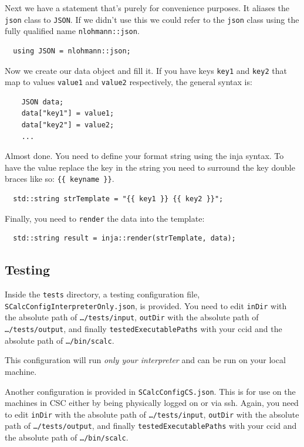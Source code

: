 \documentclass{article}
\newcommand{\code}[1]{\texttt{\textmd{#1}}}
\begin{document}
Next we have a statement that's purely for convenience purposes. It aliases the \code{json} class
to \code{JSON}. If we didn't use this we could refer to the \code{json} class using the fully
qualified name \code{nlohmann::json}.
\begin{lstlisting}
  using JSON = nlohmann::json;
\end{lstlisting}

Now we create our data object and fill it. If you have keys \code{key1} and \code{key2} that map to
values \code{value1} and \code{value2} respectively, the general syntax is:
\begin{lstlisting}
    JSON data;
    data["key1"] = value1;
    data["key2"] = value2;
    ...
\end{lstlisting}

Almost done. You need to define your format string using the inja syntax. To have the value replace
the key in the string you need to surround the key double braces like so: \code{\{\{ keyname \}\}}.
\begin{lstlisting}
  std::string strTemplate = "{{ key1 }} {{ key2 }}";
\end{lstlisting}

Finally, you need to \code{render} the data into the template:
\begin{lstlisting}
  std::string result = inja::render(strTemplate, data);
\end{lstlisting}

\subsection{Testing}
Inside the \code{tests} directory, a testing configuration file,
\code{SCalcConfigInterpreterOnly.json}, is provided. You need to edit \code{inDir} with the
absolute path of \code{\ldots/tests/input}, \code{outDir} with the absolute path of
\code{\ldots/tests/output}, and finally \code{testedExecutablePaths} with your ccid and the
absolute path of \code{\ldots/bin/scalc}.

This configuration will run \textit{only your interpreter} and can be run on your local machine.

Another configuration is provided in \code{SCalcConfigCS.json}. This is for use on the machines in
CSC either by being physically logged on or via ssh. Again, you need to edit \code{inDir} with the
absolute path of \code{\ldots/tests/input}, \code{outDir} with the absolute path of
\code{\ldots/tests/output}, and finally \code{testedExecutablePaths} with your ccid and the
absolute path of \code{\ldots/bin/scalc}.
\end{document}
